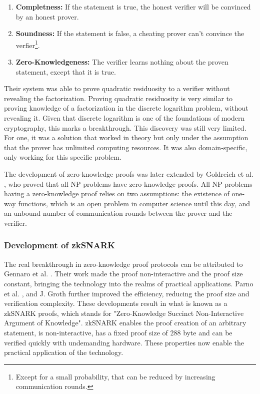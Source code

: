 \documentclass[../../thesis.tex]{subfiles}
\begin{document}
\begin{enumerate}
    \item \textbf{Completness:} If the statement is true, the honest verifier will be convinced by an honest prover.
    \item \textbf{Soundness:} If the statement is false, a cheating prover can't convince the verfier\footnote{Except for a small probability, that can be reduced by increasing communication rounds.}.
    \item \textbf{Zero-Knowledgeness:} The verifier learns nothing about the proven statement, except that it is true. 
\end{enumerate}

Their system was able to prove quadratic residuosity to a verifier without revealing the factorization. Proving quadratic residuosity is very similar to proving knowledge of a factorization in the discrete logarithm problem, without revealing it. Given that discrete logarithm is one of the foundations of modern cryptography, this marks a breakthrough. This discovery was still very limited. For one, it was a solution that worked in theory but only under the assumption that the prover has unlimited computing resources. It was also domain-specific, only working for this specific problem. 

The development of zero-knowledge proofs was later extended by Goldreich et al. \cite{goldreich1991proofs}, who proved that all NP problems have zero-knowledge proofs. All NP problems having a zero-knowledge proof relies on two assumptions: the existence of one-way functions, which is an open problem in computer science until this day, and an unbound number of communication rounds between the prover and the verifier.

\subsubsection{Development of zkSNARK}
The real breakthrough in zero-knowledge proof protocols can be attributed to Gennaro et al. \cite{gennaro2013quadratic}. Their work made the proof non-interactive and the proof size constant, bringing the technology into the realms of practical applications. Parno et al. \cite{parno2013pinocchio}, and J. Groth \cite{groth16} further improved the efficiency, reducing the proof size and verification complexity. These developments result in what is known as a zkSNARK proofs, which stands for "Zero-Knowledge Succinct Non-Interactive Argument of Knowledge". zkSNARK enables the proof creation of an arbitrary statement, is non-interactive, has a fixed proof size of 288 byte and can be verified quickly with undemanding hardware. These properties now enable the practical application of the technology.
\end{document}
